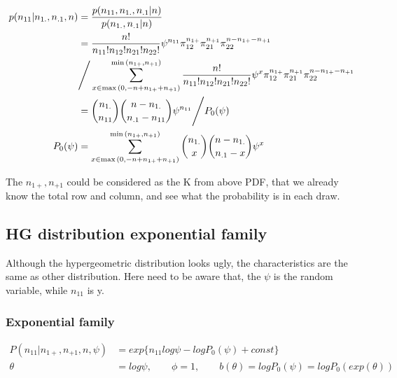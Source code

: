 \documentclass[11pt]{article} %
\begin{document}
\begin{itemize}
\begin{align*}
	p(n_{11}| n_{1.}, n_{.1}, n)	&=   \frac{p(n_{11}, n_{1.}, n_{.1}| n)}{p( n_{1.}, n_{.1}| n)}\\
	&= \frac{n!}{n_{11}!n_{12}!n_{21}!n_{22}!} \psi^{n_{11}} \pi_{12}^{n_{1+}} \pi_{21}^{n_{+1}} \pi_{22}^{n-n_{1+}-n_{+1}}
	\\
	& \Bigg{/} \sum_{x \in \max{(0, -n + n_{1+} + n_{+1})}}^{\min{(n_{1+}, n_{+1})}} \frac{n!}{n_{11}!n_{12}!n_{21}!n_{22}!} \psi^{x} \pi_{12}^{n_{1+}} \pi_{21}^{n_{+1}} \pi_{22}^{n-n_{1+}-n_{+1}}\\
	&= {n_{1.} \choose n_{11}} {n-n_{1.} \choose n_{.1}-n_{11}} \psi^{n_{11}} \Bigg{/} P_0(\psi) \\
	P_0(\psi) &= \sum_{x \in \max{(0, -n + n_{1+} + n_{+1})}}^{\min{(n_{1+}, n_{+1})}} {n_{1.} \choose x} {n-n_{1.} \choose n_{.1}-x} \psi^{x}
\end{align*}


The $n_{1+}, n_{+1}$ could be considered as the K from above PDF, that we already know the total row and column, and see what the probability is in each draw. 


\subsection{HG distribution exponential family}
Although the hypergeometric distribution looks ugly, the characteristics are the same as other distribution. Here need to be aware that, the $\psi$ is the random variable, while $n_{11}$ is y.

\subsubsection{Exponential family}
\begin{align*}
	P(n_{11}| n_{1+}, n_{+1}, n, \psi) &= exp\{ n_{11} log \psi - log P_0(\psi) + const \} \\
	\theta &= log \psi, \qquad \phi = 1, \qquad b(\theta) = log P_0(\psi) = log P_0(exp(\theta))
\end{align*}


\end{itemize}
\end{document}
